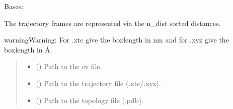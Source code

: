 \documentclass[a4paper,10pt,english]{report}
\begin{document}

\begin{fulllineitems}
\label{\detokenize{NNucleate:NNucleate.dataset.NdistTrajectory}}
\pysigstartsignatures
{}
\pysigstopsignatures
\sphinxAtStartPar
Bases: 
\begin{description}
\sphinxAtStartPar
The trajectory frames are represented via the n\_dist sorted distances.

\end{description}

\begin{sphinxadmonition}{warning}{Warning:}
\sphinxAtStartPar
For .xtc give the boxlength in nm and for .xyz give the boxlength in Å.
\end{sphinxadmonition}
\begin{quote}\begin{description}
\begin{itemize}
\item {} 
\sphinxAtStartPar
{} () \textendash{} Path to the cv file.

\item {} 
\sphinxAtStartPar
{} () \textendash{} Path to the trajectory file (.xtc/.xyz).

\item {} 
\sphinxAtStartPar
{} () \textendash{} Path to the topology file (.pdb).


\end{itemize}
\end{description}
\end{quote}
\end{fulllineitems}
\end{document}
